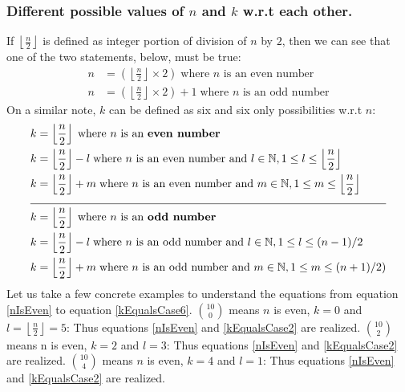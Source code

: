\documentclass[10pt, twoside]{article}
\newcommand*{\Combination}[2]{\binom{#1}{#2}}%
\newcommand{\floordivision}[2]{\left\lfloor \frac{#1}{#2} \right\rfloor}
\begin{document}
\subsubsection{Different possible values of $n$ and $k$ w.r.t each other.}
 If $\floordivision{n}{2}$ is defined as integer portion of division of $n$ by $2$, then we can see that one of the two statements, below, must be true:
 \begin{align}
 	n &= (\floordivision{n}{2} \times 2) \; \text{where $n$ is an even number} \label{nIsEven}\\
 	n &= (\floordivision{n}{2} \times 2) + 1 \; \text{where $n$ is an odd number} \label{nIsOdd}
 \end{align}
On a similar note, $k$ can be defined as six and six only possibilities w.r.t $n$:
\begin{align}
	k &= \floordivision{n}{2} \; \text{where $n$ is an \textbf{even number} }\label{kEqualsCase1}\\
	k &= \floordivision{n}{2} - l \; \text{where $n$ is an even number and } l \in \mathbb{N} , 1 \leq l \leq \floordivision{n}{2} \label{kEqualsCase2}\\
	k &= \floordivision{n}{2} + m \; \text{where $n$ is an even number and } m \in \mathbb{N} , 1 \leq m \leq \floordivision{n}{2} \label{kEqualsCase3}\\
	\cline{1-2}
	k &= \floordivision{n}{2} \; \text{where $n$ is an \textbf{odd number} }\label{kEqualsCase4}\\
	k &= \floordivision{n}{2} - l \; \text{where $n$ is an odd number and } l \in \mathbb{N} , 1 \leq l \leq (n-1)/2 \label{kEqualsCase5}\\
	k &= \floordivision{n}{2} + m \; \text{where $n$ is an odd number and } m \in \mathbb{N} , 1 \leq m \leq (n+1)/2) \label{kEqualsCase6}		
\end{align}
Let us take a few concrete examples to understand the equations from equation \eqref{nIsEven} to equation \eqref{kEqualsCase6}.\newline\newline
$\Combination{10}{0}$ means $n$ is even, $k = 0$ and $l=\floordivision{n}{2}=5$: Thus equations \eqref{nIsEven} and \eqref{kEqualsCase2} are realized.\newline\newline
$\Combination{10}{2}$ means n is even, $k = 2$ and $l=3$: Thus equations \eqref{nIsEven} and \eqref{kEqualsCase2} are realized.\newline\newline
$\Combination{10}{4}$ means $n$ is even, $k = 4$ and $l=1$: Thus equations \eqref{nIsEven} and \eqref{kEqualsCase2} are realized.\newline\newline
\end{document}

